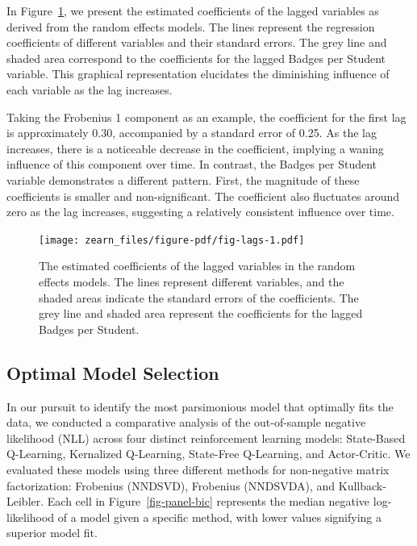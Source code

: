 \documentclass[
  number,
  preprint,
  3p,
  onecolumn]{elsarticle}
\begin{document}
In Figure~\ref{fig-lags}, we present the estimated coefficients of the
lagged variables as derived from the random effects models. The lines
represent the regression coefficients of different variables and their
standard errors. The grey line and shaded area correspond to the
coefficients for the lagged Badges per Student variable. This graphical
representation elucidates the diminishing influence of each variable as
the lag increases.

Taking the Frobenius 1 component as an example, the coefficient for the
first lag is approximately 0.30, accompanied by a standard error of
0.25. As the lag increases, there is a noticeable decrease in the
coefficient, implying a waning influence of this component over time. In
contrast, the Badges per Student variable demonstrates a different
pattern. First, the magnitude of these coefficients is smaller and
non-significant. The coefficient also fluctuates around zero as the lag
increases, suggesting a relatively consistent influence over time.

\begin{figure}

{\centering \texttt{[image: zearn\_files/figure-pdf/fig-lags-1.pdf]}

}

\caption{\label{fig-lags}The estimated coefficients of the lagged
variables in the random effects models. The lines represent different
variables, and the shaded areas indicate the standard errors of the
coefficients. The grey line and shaded area represent the coefficients
for the lagged Badges per Student.}

\end{figure}

\hypertarget{optimal-model-selection}{%
\subsection{Optimal Model Selection}\label{optimal-model-selection}}

In our pursuit to identify the most parsimonious model that optimally
fits the data, we conducted a comparative analysis of the out-of-sample
negative likelihood (NLL) across four distinct reinforcement learning
models: State-Based Q-Learning, Kernalized Q-Learning, State-Free
Q-Learning, and Actor-Critic. We evaluated these models using three
different methods for non-negative matrix factorization: Frobenius
(NNDSVD), Frobenius (NNDSVDA), and Kullback-Leibler. Each cell in
Figure~\ref{fig-panel-bic} represents the median negative log-likelihood
of a model given a specific method, with lower values signifying a
superior model fit.
\end{document}
